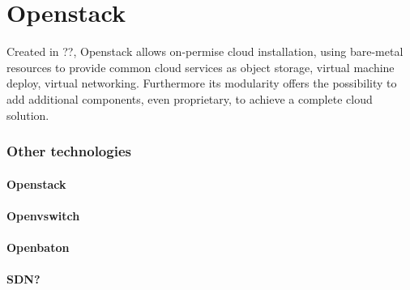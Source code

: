 \documentclass[10pt]{book}
\begin{document}

\section{Openstack}
\label{chap:prjan:sec:openstack}
Created in ??, 
Openstack allows on-permise cloud installation, using bare-metal resources to 
provide common cloud services as object storage, virtual machine deploy, 
virtual networking. Furthermore its modularity offers the possibility to add 
additional components, even proprietary, to achieve a complete cloud solution.






\subsubsection{Other technologies}
\paragraph{Openstack}
\paragraph{Openvswitch}
\paragraph{Openbaton}
\paragraph{SDN?}
\end{document}

